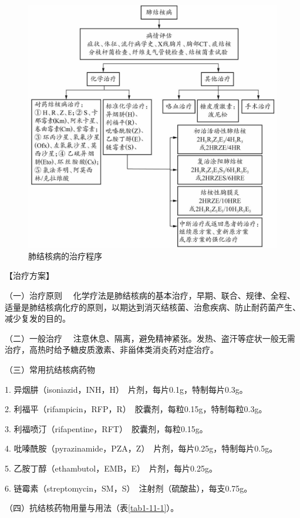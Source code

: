 \begin{figure}[!htbp]
 \centering
 \includegraphics{./images/Image00023.jpg}
 \captionsetup{justification=centering}
 \caption{肺结核病的治疗程序}
 \label{fig1-11-1}
  \end{figure} 

【治疗方案】

{（一）治疗原则}
　化学疗法是肺结核病的基本治疗，早期、联合、规律、全程、适量是肺结核病化疗的原则，以期达到消灭结核菌、治愈疾病、防止耐药菌产生、减少复发的目的。

{（二）一般治疗}
　注意休息、隔离，避免精神紧张。发热、盗汗等症状一般无需治疗，高热时给予糖皮质激素、非甾体类消炎药对症治疗。

{（三）常用抗结核病药物}

1. 异烟肼（isoniazid，INH，H）　片剂，每片0.1g，特制每片0.3g。

2. 利福平（rifampicin，RFP，R）　胶囊剂，每粒0.15g，特制每粒0.3g。

3. 利福喷汀（rifapentine，RFT）　胶囊剂，每粒0.15g。

4. 吡嗪酰胺（pyrazinamide，PZA，Z）　片剂，每片0.25g，特制每片0.5g。

5. 乙胺丁醇（ethambutol，EMB，E）　片剂，每片0.25g。

6. 链霉素（streptomycin，SM，S）　注射剂（硫酸盐），每支0.75g。

{（四）抗结核药物用量与用法（表\ref{tab1-11-1}）。}

